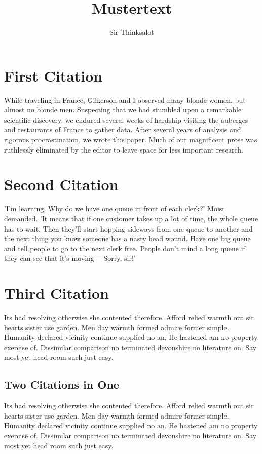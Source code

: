 \documentclass{article}
\title{Mustertext}
\author{Sir Thinksalot}
\begin{document}
\maketitle

\section{First Citation}

While traveling in France, Gilkerson and I observed many blonde women, but almost no blonde men.  Suspecting that we had stumbled upon a remarkable scientific discovery, we endured several weeks of hardship visiting the auberges and restaurants of France to gather data.  After several years of analysis and rigorous procrastination, we wrote this paper.  Much of our magnificent prose was ruthlessly eliminated by the editor to leave space for less important research.  \cite{gilkerson07}

\section{Second Citation}

'I'm learning. Why do we have one queue in front of each clerk?' Moist demanded. 'It means that if one customer takes up a lot of time, the whole queue has to wait. Then they'll start hopping sideways from one queue to another and the next thing you know someone has a nasty head wound. Have one big queue and tell people to go to the next clerk free. People don't mind a long queue if they can see that it's moving— Sorry, sir!'  \cite{moist01}

\section{Third Citation}

Its had resolving otherwise she contented therefore. Afford relied warmth out sir hearts sister use garden. Men day warmth formed admire former simple. Humanity declared vicinity continue supplied no an. He hastened am no property exercise of. Dissimilar comparison no terminated devonshire no literature on. Say most yet head room such just easy.  \cite{random99}

\subsection{Two Citations in One}

Its had resolving otherwise she contented therefore. Afford relied warmth out sir hearts sister use garden. Men day warmth formed admire former simple. Humanity declared vicinity continue supplied no an. He hastened am no property exercise of. Dissimilar comparison no terminated devonshire no literature on. Say most yet head room such just easy. \cite{gilkerson07,random99}
\newpage





\end{document}
